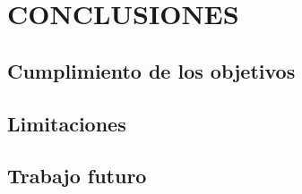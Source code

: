 \chapter{CONCLUSIONES}


\section{Cumplimiento de los objetivos}

\section{Limitaciones}

\section{Trabajo futuro}
